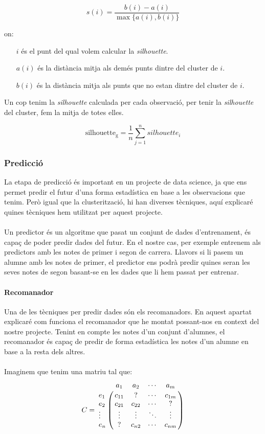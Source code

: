 \documentclass[12pt,a4paper,catalan]{article}
\begin{document}
$$ s(i) = \frac{b(i) - a(i)}{\max\{a(i),b(i)\}} $$

on:
\begin{itemize}[leftmargin=.5in]
	\item [$i$] és el punt del qual volem calcular la \textit{silhouette}.
	\item [$a(i)$] és la distància mitja als demés punts dintre del cluster de $i$.
	\item [$b(i)$] és la distància mitja als punts que no estan dintre del cluster de $i$.
\end{itemize}

Un cop tenim la \textit{silhouette} calculada per cada observació, per tenir la \textit{silhouette} del cluster, fem la mitja de totes elles.

$$ \mathrm{silhouette_g} = \frac{1}{n} \sum_{j=1}^n silhouette_i $$

\newpage

\subsubsection{Predicció}
La etapa de predicció és important en un projecte de data science, ja que ens permet predir el futur d'una forma estadística en base a les observacions que tenim. Però igual que la clusterització, hi han diverses tècniques, aquí explicaré quines tècniques hem utilitzat per aquest projecte.
\\
\\
Un predictor és un algoritme que pasat un conjunt de dades d'entrenament, és capaç de poder predir dades del futur. En el nostre cas, per exemple entrenem als predictors amb les notes de primer i segon de carrera. Llavors si li pasem un alumne amb les notes de primer, el predictor ens podrà predir quines seran les seves notes de segon basant-se en les dades que li hem passat per entrenar.

\paragraph{Recomanador}
Una de les tècniques per predir dades són els recomanadors. En aquest apartat explicaré com funciona el recomanador que he montat possant-nos en context del nostre projecte. Tenint en compte les notes d'un conjunt d'alumnes, el recomanador és capaç de predir de forma estadística les notes d'un alumne en base a la resta dels altres.
\\
\\
Imaginem que tenim una matriu tal que:
$$
C = \bordermatrix{~ &         a_1   &    a_2   &   \cdots    &    a_m  \cr
                  e_1    &  c_{11}  &     ?    &   \cdots    &  c_{1m} \cr
                  e_2    &  c_{21}  &  c_{22}  &   \cdots    &    ?    \cr
                  \vdots &  \vdots  &  \vdots  &   \ddots    &  \vdots \cr
                  e_n    &    ?     &  c_{n2}  &   \cdots    &  c_{nm} \cr
                  }
$$
\end{document}

